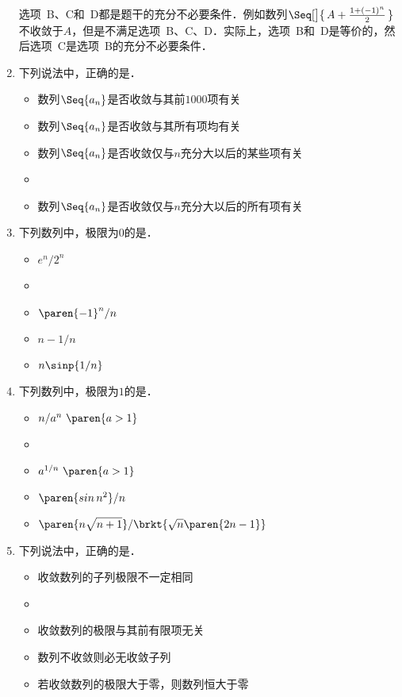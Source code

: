 \begin{enumerate}
  \ifshowsol
    选项~B、C和~D都是题干的充分不必要条件．例如数列\(\Seq[\big]{\,A + \frac{1+(-1)^n}{2}\,}\)不收敛于\(A\)，但是不满足选项~B、C、D．实际上，选项~B和~D是等价的，然后选项~C是选项~B的充分不必要条件．
  \fi

\item 下列说法中，正确的是\uline{\makebox[10em]{}}．
  \begin{itemize}
    \renewcommand{\labelitemi}{\faCircleThin}
  \item 数列\(\Seq{a_n}\)是否收敛与其前\(1000\)项有关
  \item 数列\(\Seq{a_n}\)是否收敛与其所有项均有关
  \item 数列\(\Seq{a_n}\)是否收敛仅与\(n\)充分大以后的某些项有关
    \ifshowsol
    \item[\faCircle]
    \else
    \item
    \fi
    数列\(\Seq{a_n}\)是否收敛仅与\(n\)充分大以后的所有项有关
  \end{itemize}

\item 下列数列中，极限为\(0\)的是\uline{\makebox[6em]{}}．
  \begin{itemize}
    \renewcommand{\labelitemi}{\faCircleThin}
  \item \(e^n/2^n\)
    \ifshowsol
    \item[\faCircle]
    \else
    \item
    \fi
    \(\paren{-1}^n/n\)
  \item \(n - 1/n\)
  \item \(n \sinp{1/n}\)
  \end{itemize}

\item 下列数列中，极限为\(1\)的是\uline{\makebox[6em]{}}．
  \begin{itemize}
    \renewcommand{\labelitemi}{\faCircleThin}
  \item \(n/a^n\ \paren{a > 1}\)
    \ifshowsol
    \item[\faCircle]
    \else
    \item
    \fi
    \(a^{1/n}\ \paren{a > 1}\)
  \item \(\paren{\sin n^2}/{n}\)
  \item \(\paren{n \sqrt{n+\smash{1}\mathstrut}}/\brkt{\sqrt n \paren{2n-1}}\)
  \end{itemize}

\item 下列说法中，正确的是\uline{\makebox[10em]{}}．
  \begin{itemize}
    \renewcommand{\labelitemi}{\faCircleThin}
  \item 收敛数列的子列极限不一定相同
    \ifshowsol
    \item[\faCircle]
    \else
    \item
    \fi
    收敛数列的极限与其前有限项无关
  \item 数列不收敛则必无收敛子列
  \item 若收敛数列的极限大于零，则数列恒大于零
  \end{itemize}


\end{enumerate}

